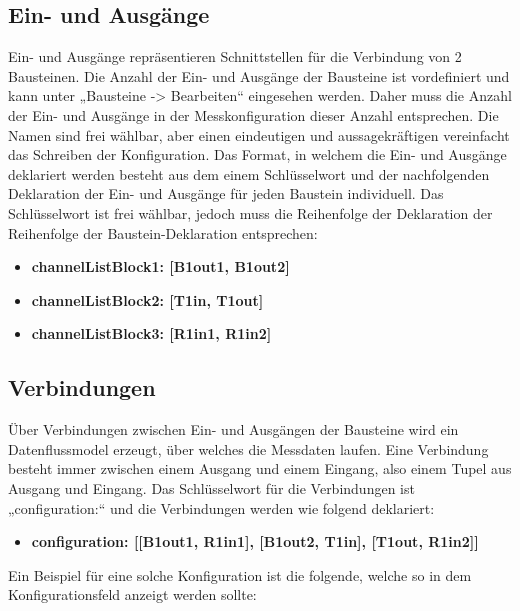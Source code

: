 \documentclass[parskip=full]{scrartcl}
\begin{document}
\subsection{Ein- und Ausgänge}

Ein- und Ausgänge repräsentieren Schnittstellen für die Verbindung von 2  
Bausteinen. Die Anzahl der Ein- und Ausgänge der Bausteine ist vordefiniert und kann unter „Bausteine -> Bearbeiten“ eingesehen werden. Daher muss die Anzahl der Ein- und Ausgänge in der Messkonfiguration dieser Anzahl entsprechen. Die Namen sind frei wählbar, aber einen eindeutigen und aussagekräftigen vereinfacht das Schreiben der Konfiguration.  
Das Format, in welchem die Ein- und Ausgänge deklariert werden besteht aus dem einem Schlüsselwort und der nachfolgenden Deklaration der Ein- und Ausgänge für jeden Baustein individuell. Das Schlüsselwort ist frei wählbar, jedoch muss die Reihenfolge der Deklaration der Reihenfolge der Baustein-Deklaration entsprechen:  

\begin{itemize}

\item[ ] \textbf{channelListBlock1: [B1out1, B1out2]}
\item[ ] \textbf{channelListBlock2: [T1in, T1out]}
\item[ ] \textbf{channelListBlock3: [R1in1, R1in2]} 

\end{itemize}

\subsection{Verbindungen}

Über Verbindungen zwischen Ein- und Ausgängen der Bausteine wird ein Datenflussmodel erzeugt, über welches die Messdaten laufen.  Eine Verbindung besteht immer zwischen einem Ausgang und einem Eingang, also einem Tupel aus Ausgang und Eingang.   
Das Schlüsselwort für die Verbindungen ist „configuration:“ und die Verbindungen werden wie folgend deklariert:  

\begin{itemize}

\item[ ] \textbf{configuration: [[B1out1, R1in1], [B1out2, T1in], [T1out, R1in2]]}

\end{itemize}

Ein Beispiel für eine solche Konfiguration ist die folgende, welche so in dem Konfigurationsfeld anzeigt werden sollte:
\end{document}
